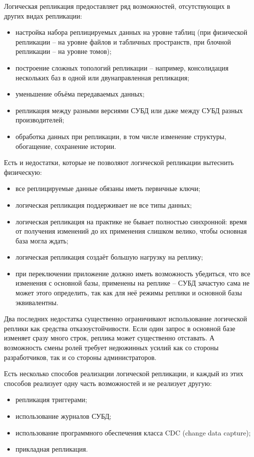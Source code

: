 Логическая репликация предоставляет ряд возможностей, отсутствующих в других видах репликации:
\begin{itemize}
    \item настройка набора реплицируемых данных на уровне таблиц (при физической репликации – на уровне файлов и табличных пространств, при блочной репликации – на уровне томов);
    \item построение сложных топологий репликации – например, консолидация нескольких баз в одной или двунаправленная репликация;
    \item уменьшение объёма передаваемых данных;
    \item репликация между разными версиями СУБД или даже между СУБД разных производителей;
    \item обработка данных при репликации, в том числе изменение структуры, обогащение, сохранение истории.
\end{itemize}

Есть и недостатки, которые не позволяют логической репликации вытеснить физическую:
\begin{itemize}
    \item все реплицируемые данные обязаны иметь первичные ключи;
    \item логическая репликация поддерживает не все типы данных;
    \item логическая репликация на практике не бывает полностью синхронной: время от получения изменений до их применения слишком велико, чтобы основная база могла ждать;
    \item логическая репликация создаёт большую нагрузку на реплику;
    \item при переключении приложение должно иметь возможность убедиться, что все изменения с основной базы, применены на реплике – СУБД зачастую сама не может этого определить, так как для неё режимы реплики и основной базы эквивалентны.
\end{itemize}

Два последних недостатка существенно ограничивают использование логической реплики как средства отказоустойчивости. Если
один запрос в основной базе изменяет сразу много строк, реплика может существенно отставать. А возможность смены ролей
требует недюжинных усилий как со стороны разработчиков, так и со стороны администраторов.

Есть несколько способов реализации логической репликации, и каждый из этих способов реализует одну часть возможностей и
не реализует другую:
\begin{itemize}
    \item репликация триггерами;
    \item использование журналов СУБД;
    \item использование программного обеспечения класса CDC (change data capture);
    \item прикладная репликация.
\end{itemize}

